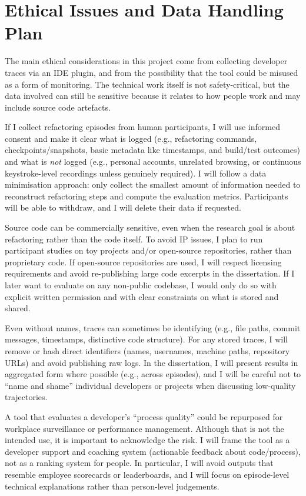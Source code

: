 \chapter{Ethical Issues and Data Handling Plan}

The main ethical considerations in this project come from collecting developer traces via an IDE plugin, and from the possibility that the tool could be misused as a form of monitoring. The technical work itself is not safety-critical, but the data involved can still be sensitive because it relates to how people work and may include source code artefacts.

If I collect refactoring episodes from human participants, I will use informed consent and make it clear what is logged (e.g., refactoring commands, checkpoints/snapshots, basic metadata like timestamps, and build/test outcomes) and what is \emph{not} logged (e.g., personal accounts, unrelated browsing, or continuous keystroke-level recordings unless genuinely required). I will follow a data minimisation approach: only collect the smallest amount of information needed to reconstruct refactoring steps and compute the evaluation metrics. Participants will be able to withdraw, and I will delete their data if requested.

Source code can be commercially sensitive, even when the research goal is about refactoring rather than the code itself. To avoid IP issues, I plan to run participant studies on toy projects and/or open-source repositories, rather than proprietary code. If open-source repositories are used, I will respect licensing requirements and avoid re-publishing large code excerpts in the dissertation. If I later want to evaluate on any non-public codebase, I would only do so with explicit written permission and with clear constraints on what is stored and shared.

Even without names, traces can sometimes be identifying (e.g., file paths, commit messages, timestamps, distinctive code structure). For any stored traces, I will remove or hash direct identifiers (names, usernames, machine paths, repository URLs) and avoid publishing raw logs. In the dissertation, I will present results in aggregated form where possible (e.g., across episodes), and I will be careful not to ``name and shame'' individual developers or projects when discussing low-quality trajectories.

A tool that evaluates a developer's ``process quality'' could be repurposed for workplace surveillance or performance management. Although that is not the intended use, it is important to acknowledge the risk. I will frame the tool as a developer support and coaching system (actionable feedback about code/process), not as a ranking system for people. In particular, I will avoid outputs that resemble employee scorecards or leaderboards, and I will focus on episode-level technical explanations rather than person-level judgements.


